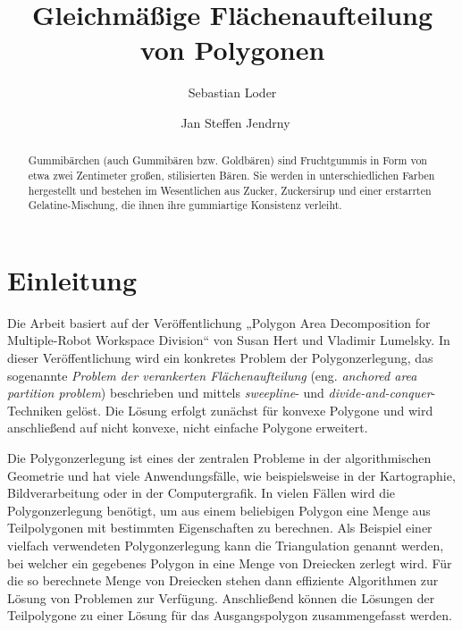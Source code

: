 \documentclass[ngerman]{seminarbeitrag}
\begin{document}
\title{Gleichmäßige Flächenaufteilung von Polygonen}
\author{Sebastian Loder\and\ Jan Steffen Jendrny}

\maketitle%

\begin{abstract}
Gummibärchen (auch Gummibären bzw. Goldbären) sind Fruchtgummis in Form von etwa
zwei Zentimeter großen, stilisierten Bären. Sie werden in unterschiedlichen Farben hergestellt
und bestehen im Wesentlichen aus Zucker, Zuckersirup und einer erstarrten
Gelatine-Mischung, die ihnen ihre gummiartige Konsistenz verleiht.

\end{abstract}

\section{Einleitung}\label{einleitung}
Die Arbeit basiert auf der Veröffentlichung „Polygon Area Decomposition for Multiple-Robot Workspace Division“ von Susan Hert und Vladimir Lumelsky.
In dieser Veröffentlichung wird ein konkretes Problem der Polygonzerlegung, das sogenannte \emph{Problem der verankerten Flächenaufteilung} (eng. \emph{anchored
area partition problem}) beschrieben und mittels \emph{sweepline}- und \emph{divide-and-conquer}-Techniken gelöst. Die Lösung erfolgt zunächst für konvexe Polygone und wird
anschließend auf nicht konvexe, nicht einfache Polygone erweitert.

Die Polygonzerlegung ist eines der zentralen Probleme in der algorithmischen Geometrie und hat viele Anwendungsfälle, wie beispielsweise in der Kartographie,
Bildverarbeitung oder in der Computergrafik. In vielen Fällen wird die Polygonzerlegung benötigt, um aus einem beliebigen Polygon eine Menge aus Teilpolygonen mit bestimmten
Eigenschaften zu berechnen. Als Beispiel einer vielfach verwendeten Polygonzerlegung kann die Triangulation genannt werden, bei welcher ein gegebenes Polygon in eine Menge von Dreiecken
zerlegt wird. Für die so berechnete Menge von Dreiecken stehen dann effiziente Algorithmen zur Lösung von Problemen zur Verfügung. Anschließend können die Lösungen der Teilpolygone zu
einer Lösung für das Ausgangspolygon zusammengefasst werden. \\
\end{document}
